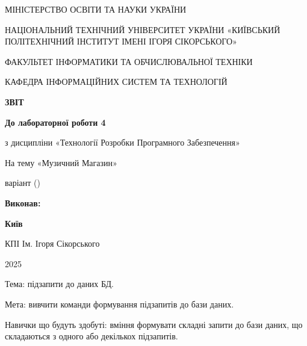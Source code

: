 \documentclass{article}
\begin{document}
    \begin{titlepage}
        \begin{center}
            {\Large
                МІНІСТЕРСТВО ОСВІТИ ТА НАУКИ УКРАЇНИ

                НАЦІОНАЛЬНИЙ ТЕХНІЧНИЙ УНІВЕРСИТЕТ УКРАЇНИ
                «КИЇВСЬКИЙ ПОЛІТЕХНІЧНИЙ ІНСТИТУТ ІМЕНІ ІГОРЯ СІКОРСЬКОГО»

                ФАКУЛЬТЕТ ІНФОРМАТИКИ ТА ОБЧИСЛЮВАЛЬНОЇ ТЕХНІКИ

                КАФЕДРА ІНФОРМАЦІЙНИХ СИСТЕМ ТА ТЕХНОЛОГІЙ
            }


            \vspace{60mm}
            {\large
                \textbf{ЗВІТ}

                \vspace{5mm}

                \textbf{До лабораторної роботи 4}

                \vspace{5mm}

                з дисципліни «Технології Розробки Програмного Забезпечення»
            }

            На тему «Музичний Магазин»

            варіант  ()
        \end{center}

        \vfill
        \hfill
        \begin{minipage}[t]{0.35\textwidth}
            \textbf{Виконав:}
        \end{minipage}

        \vfill

        \begin{center}
            {\bf
                Київ

                КПІ Ім. Ігоря Сікорського

                2025
            }
        \end{center}
    \end{titlepage}
    \newpage

    Тема: підзапити до даних БД.

    Мета: вивчити команди формування підзапитів до бази даних.

    Навички що будуть здобуті: вміння формувати складні запити до бази даних, що складаються з одного або декількох підзапитів.
\end{document}
